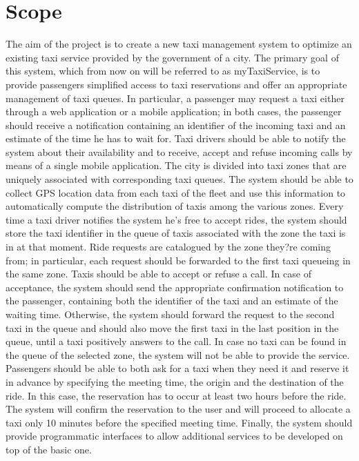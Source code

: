\section{Scope}
The aim of the project is to create a new taxi management system to optimize an existing taxi service provided by the government of a city. The primary goal of this system, which from now on will be referred to as myTaxiService, is to provide passengers simplified access to taxi reservations and offer an appropriate management of taxi queues. In particular, a passenger may request a taxi either through a web application or a mobile application; in both cases, the passenger should receive a notification containing an identifier of the incoming taxi and an estimate of the time he has to wait for. Taxi drivers should be able to notify the system about their availability and to receive, accept and refuse incoming calls by means of a single mobile application. The city is divided into taxi zones that are uniquely associated with corresponding taxi queues. The system should be able to collect GPS location data from each taxi of the fleet and use this information to automatically compute the distribution of taxis among the various zones. Every time a taxi driver notifies the system he's free to accept rides, the system should store the taxi identifier in the queue of taxis associated with the zone the taxi is in at that moment. Ride requests are catalogued by the zone they?re coming from; in particular, each request should be forwarded to the first taxi queueing in the same zone. Taxis should be able to accept or refuse a call. In case of acceptance, the system should send the appropriate confirmation notification to the passenger, containing both the identifier of the taxi and an estimate of the waiting time. Otherwise, the system should forward the request to the second taxi in the queue and should also move the first taxi in the last position in the queue, until a taxi positively answers to the call. In case no taxi can be found in the queue of the selected zone, the system will not be able to provide the service. Passengers should be able to both ask for a taxi when they need it and reserve it in advance by specifying the meeting time, the origin and the destination of the ride. In this case, the reservation has to occur at least two hours before the ride. The system will confirm the reservation to the user and will proceed to allocate a taxi only 10 minutes before the specified meeting time. Finally, the system should provide programmatic interfaces to allow additional services to be developed on top of the basic one.


